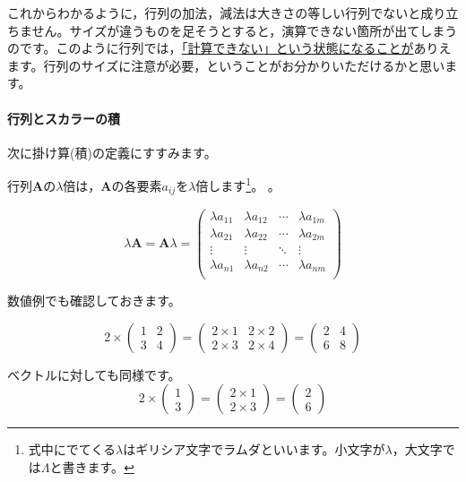 \documentclass{ltjsbook}
\begin{document}
これからわかるように，行列の加法，減法は大きさの等しい行列でないと成り立ちません。サイズが違うものを足そうとすると，演算できない箇所が出てしまうのです。このように行列では，\underline{「計算できない」という状態になることが}ありえます。行列のサイズに注意が必要，ということがお分かりいただけるかと思います。
\paragraph{行列とスカラーの積}
次に掛け算(積)の定義にすすみます。

行列$\bm{A}$の$\lambda$倍は，$\bm{A}$の各要素$a_{ij}$を$\lambda$倍します\footnote{式中にでてくる$\lambda$はギリシア文字でラムダといいます。小文字が$\lambda$，大文字では$\Lambda$と書きます。}。
。


\begin{equation*}
    \lambda \bm{A} = \bm{A} \lambda =
    \begin{pmatrix}
        \lambda a_{11} & \lambda a_{12} & \cdots & \lambda a_{1m} \\
        \lambda a_{21} & \lambda a_{22} & \cdots & \lambda a_{2m} \\
        \vdots         & \vdots         & \ddots & \vdots         \\
        \lambda a_{n1} & \lambda a_{n2} & \cdots & \lambda a_{nm} \\
    \end{pmatrix}
\end{equation*}


数値例でも確認しておきます。

\begin{equation*}
    2 \times
    \begin{pmatrix}
        1 & 2 \\
        3 & 4
    \end{pmatrix}
    =
    \begin{pmatrix}
        2 \times 1 & 2 \times 2 \\
        2 \times 3 & 2 \times 4
    \end{pmatrix}
    =
    \begin{pmatrix}
        2 & 4 \\
        6 & 8
    \end{pmatrix}
\end{equation*}

ベクトルに対しても同様です。
\begin{equation*}
    2 \times
    \begin{pmatrix}
        1 \\
        3
    \end{pmatrix}
    =
    \begin{pmatrix}
        2 \times 1 \\
        2 \times 3
    \end{pmatrix}
    =
    \begin{pmatrix}
        2 \\
        6
    \end{pmatrix}
\end{equation*}
\end{document}
